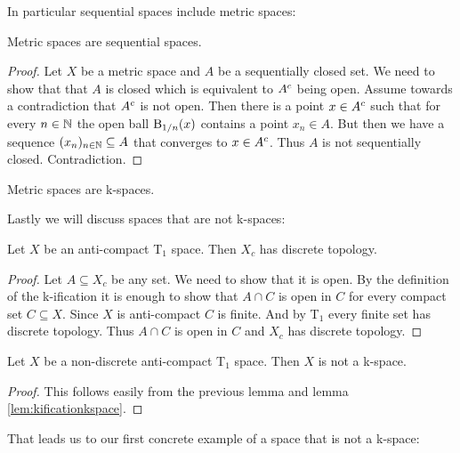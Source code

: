 In particular sequential spaces include metric spaces: 

\begin{lem}\label{lem:metricissequential}
    Metric spaces are sequential spaces.
\end{lem}
\begin{proof}
    Let $X$ be a metric space and $A$ be a sequentially closed set. 
    We need to show that that $A$ is closed which is equivalent to $A^{c}$ being open.
    Assume towards a contradiction that $A^{c}$ is not open. 
    Then there is a point $x \in A^{c}$ such that for every $n \in \mathbb{N}$ the open ball $\text{B}_{1/n}(x)$ contains a point $x_n \in A$. 
    But then we have a sequence $(x_n)_{n \in \mathbb{N}} \subseteq A$ that converges to $x \in A^{c}$. Thus $A$ is not sequentially closed. Contradiction. 
\end{proof}

\begin{cor}
    Metric spaces are k-spaces.
\end{cor}

Lastly we will discuss spaces that are not k-spaces:

\begin{lem}
    Let $X$ be an anti-compact T$_1$ space.
    Then $X_c$ has discrete topology.
\end{lem}
\begin{proof}
    Let $A \subseteq X_c$ be any set. We need to show that it is open. 
    By the definition of the k-ification it is enough to show that $A \cap C$
    is open in $C$ for every compact set $C \subseteq X$. 
    Since $X$ is anti-compact $C$ is finite.
    And by T$_1$ every finite set has discrete topology. 
    Thus $A \cap C$ is open in $C$ and $X_c$ has discrete topology.
\end{proof}

\begin{cor}
    Let $X$ be a non-discrete anti-compact T$_1$ space.
    Then $X$ is not a k-space.
\end{cor}
\begin{proof}
    This follows easily from the previous lemma and lemma \ref{lem:kificationkspace}.
\end{proof}

That leads us to our first concrete example of a space that is not a k-space: 

